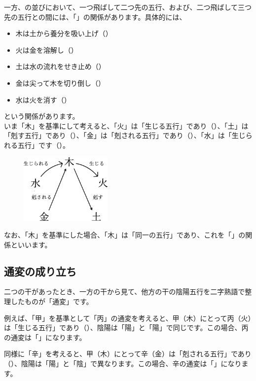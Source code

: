 \documentclass[a5paper,11pt,dvipdfmx]{tarticle}
\begin{document}
一方、の並びにおいて、一つ飛ばして二つ先の五行、および、二つ飛ばして三つ先の五行との間には、「」の関係があります。具体的には、
\begin{itemize}
\item 木は土から養分を吸い上げ（）
\item 火は金を溶解し（）
\item 土は水の流れをせき止め（）
\item 金は尖って木を切り倒し（）
\item 水は火を消す（）
\end{itemize}  
という関係があります。\\

いま「木」を基準にして考えると、「火」は「生じる五行」であり（）、「土」は「剋す五行」であり（）、「金」は「剋される五行」であり（）、「水」は「生じられる五行」です（）。

\begin{figure}[h]
  \includegraphics[width=45mm,angle=90]{figs/figure5-3.eps}
\end{figure}

なお、「木」を基準にした場合、「木」は「同一の五行」であり、これを「」の関係といいます。

\subsection{通変の成り立ち}

二つの干があったとき、一方の干から見て、他方の干の陰陽五行を二字熟語で整理したものが「通変」です。

例えば、「甲」を基準として「丙」の通変を考えると、甲（木）にとって丙（火）は「生じる五行」であり（）、陰陽は「陽」と「陽」で同じです。この場合、丙の通変は「」になります。

同様に「辛」を考えると、甲（木）にとって辛（金）は「剋される五行」であり（）、陰陽は「陽」と「陰」で異なります。この場合、辛の通変は「」になります。
\end{document}
